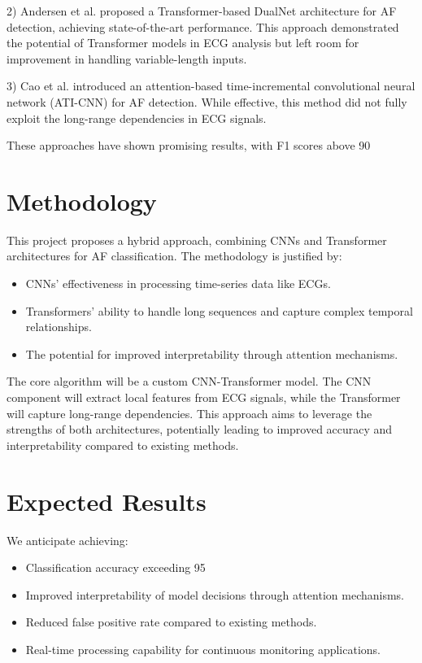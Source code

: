 \documentclass[conference]{IEEEtran}
\begin{document}
2) Andersen et al. \cite{andersen} proposed a Transformer-based DualNet architecture for AF detection, achieving state-of-the-art performance. This approach demonstrated the potential of Transformer models in ECG analysis but left room for improvement in handling variable-length inputs.

3) Cao et al. \cite{cao} introduced an attention-based time-incremental convolutional neural network (ATI-CNN) for AF detection. While effective, this method did not fully exploit the long-range dependencies in ECG signals.

These approaches have shown promising results, with F1 scores above 90%

\section{Methodology}
This project proposes a hybrid approach, combining CNNs and Transformer architectures for AF classification. The methodology is justified by:

\begin{itemize}
    \item CNNs' effectiveness in processing time-series data like ECGs.
    \item Transformers' ability to handle long sequences and capture complex temporal relationships.
    \item The potential for improved interpretability through attention mechanisms.
\end{itemize}

The core algorithm will be a custom CNN-Transformer model. The CNN component will extract local features from ECG signals, while the Transformer will capture long-range dependencies. This approach aims to leverage the strengths of both architectures, potentially leading to improved accuracy and interpretability compared to existing methods.

\section{Expected Results}
We anticipate achieving:
\begin{itemize}
    \item Classification accuracy exceeding 95%
    \item Improved interpretability of model decisions through attention mechanisms.
    \item Reduced false positive rate compared to existing methods.
    \item Real-time processing capability for continuous monitoring applications.
\end{itemize}
\end{document}
